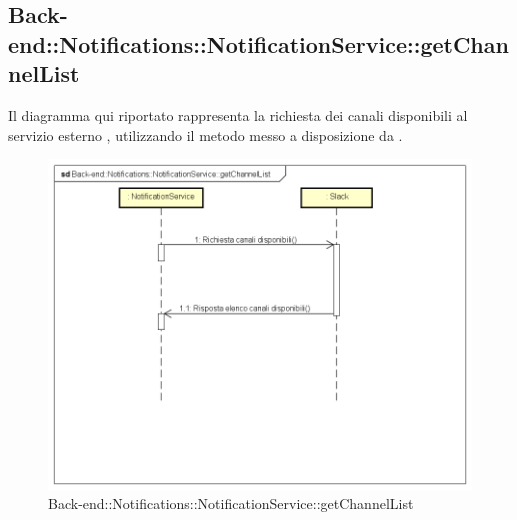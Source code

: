 \subsection{Back-end::Notifications::NotificationService::getChannelList}
Il diagramma qui riportato rappresenta la richiesta dei canali disponibili al servizio esterno , utilizzando il metodo  messo a disposizione da .
 \begin{figure}[h] \centering \includegraphics[width=\textwidth,height=\textheight,keepaspectratio]{images/diagrams/back-end/Ufficial_Backend/Back-endNotificationsNotificationServicegetChannelList.png} 	\caption{Back-end::Notifications::NotificationService::getChannelList}
\end{figure}
\newpage

